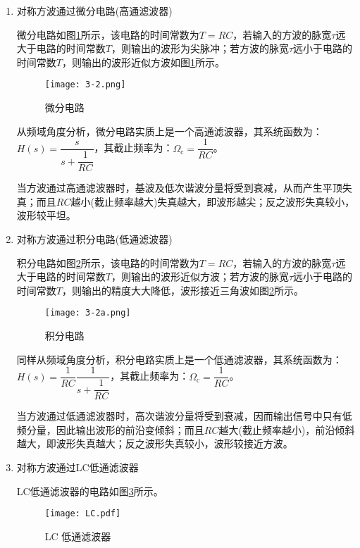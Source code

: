 \begin{enumerate}
	\item 对称方波通过微分电路(高通滤波器)

		微分电路如图\ref{fig:微分电路}所示，该电路的时间常数为$ T=RC $，若输入的方波的脉宽$ \tau $远大于电路的时间常数$ T $，则输出的波形为尖脉冲；若方波的脉宽$ \tau $远小于电路的时间常数$ T $，则输出的波形近似方波如图\ref{fig:微分电路}所示。

		\begin{figure}[htpb]
			\centering
			\texttt{[image: 3-2.png]}
			\caption{微分电路}
			\label{fig:微分电路}
		\end{figure}

		从频域角度分析，微分电路实质上是一个高通滤波器，其系统函数为：$ H(s)= \dfrac{s}{s+ \dfrac{1}{RC} } $，其截止频率为：$ \Omega_\text{c}= \dfrac{1}{RC} $。

		当方波通过高通滤波器时，基波及低次谐波分量将受到衰减，从而产生平顶失真；而且$ RC $越小(截止频率越大)失真越大，即波形越尖；反之波形失真较小，波形较平坦。
	\item 对称方波通过积分电路(低通滤波器)

		积分电路如图\ref{fig:积分电路}所示，该电路的时间常数为$ T=RC $，若输入的方波的脉宽$ \tau $远大于电路的时间常数$ T $，则输出的波形近似方波；若方波的脉宽$ \tau $远小于电路的时间常数$ T $，则输出的精度大大降低，波形接近三角波如图\ref{fig:积分电路}所示。

		\begin{figure}[htpb]
			\centering
			\texttt{[image: 3-2a.png]}
			\caption{积分电路}
			\label{fig:积分电路}
		\end{figure}

		同样从频域角度分析，积分电路实质上是一个低通滤波器，其系统函数为：$ H(s)= \dfrac{1}{RC} \dfrac{1}{s+ \dfrac{1}{RC} } $，其截止频率为：$ \Omega_\text{c}= \dfrac{1}{RC} $。

		当方波通过低通滤波器时，高次谐波分量将受到衰减，因而输出信号中只有低频分量，因此输出波形的前沿变倾斜；而且$ RC $越大(截止频率越小)，前沿倾斜越大，即波形失真越大；反之波形失真较小，波形较接近方波。
	\item 对称方波通过LC低通滤波器

		LC低通滤波器的电路如图\ref{fig:LC 低通滤波器}所示。

		\begin{figure}[htpb]
			\centering
			\texttt{[image: LC.pdf]}
			\caption{LC 低通滤波器}
			\label{fig:LC 低通滤波器}
		\end{figure}


\end{enumerate}
